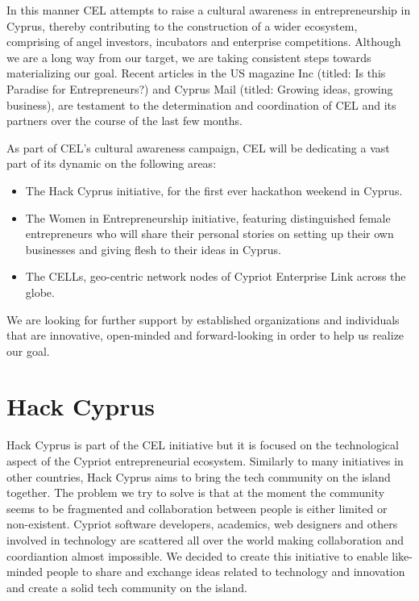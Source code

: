 \documentclass[a4paper,11pt]{report}
\begin{document}
In this manner CEL attempts to raise a cultural awareness in entrepreneurship in Cyprus, thereby contributing to the construction of a wider ecosystem, comprising of angel investors, incubators and enterprise competitions. Although we are a long way from our target, we are taking consistent steps towards materializing our goal. Recent articles in the US magazine Inc (titled: Is this Paradise for Entrepreneurs?) and Cyprus Mail (titled: Growing ideas, growing business), are testament to the determination and coordination of CEL and its partners over the course of the last few months.

As part of CEL’s cultural awareness campaign, CEL will be dedicating a vast part of its dynamic on the following areas:
\begin{itemize}
  \item The Hack Cyprus initiative, for the first ever hackathon weekend in Cyprus.
  \item The Women in Entrepreneurship initiative, featuring distinguished female entrepreneurs who will share their personal stories on setting up their own businesses and giving flesh to their ideas in Cyprus.
  \item The CELLs, geo-centric network nodes of Cypriot Enterprise Link across the globe. 
\end{itemize}

We are looking for further support by established organizations and individuals that are innovative, open-minded and forward-looking in order to help us realize our goal.

\section{Hack Cyprus}
Hack Cyprus is part of the CEL initiative but it is focused on the technological aspect of the Cypriot entrepreneurial ecosystem. Similarly to many initiatives in other countries, Hack Cyprus aims to bring the tech community on the island together. The problem we try to solve is that at the moment the community seems to be fragmented and collaboration between people is either limited or non-existent. Cypriot software developers, academics, web designers and others involved in technology are scattered all over the world making collaboration and coordiantion almost impossible. We decided to create this initiative to enable like-minded people to share and exchange ideas related to technology and innovation and create a solid tech community on the island. 
\end{document}
